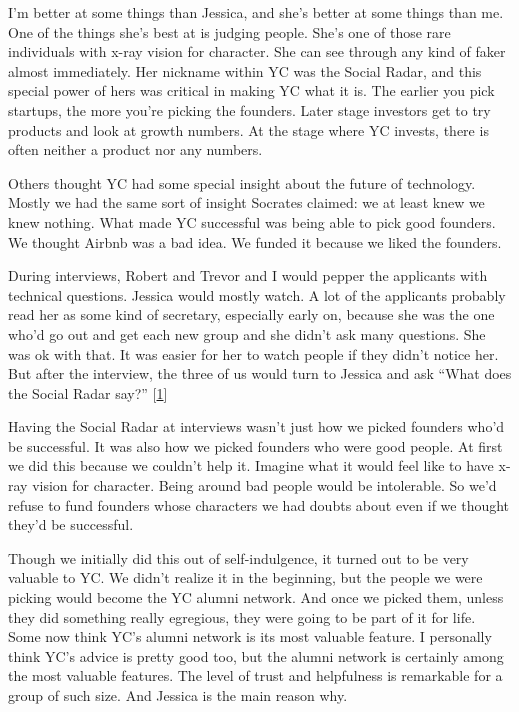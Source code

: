I'm better at some things than Jessica, and she's better at some things
than me. One of the things she's best at is judging people. She's one of
those rare individuals with x-ray vision for character. She can see
through any kind of faker almost immediately. Her nickname within YC was
the Social Radar, and this special power of hers was critical in making
YC what it is. The earlier you pick startups, the more you're picking
the founders. Later stage investors get to try products and look at
growth numbers. At the stage where YC invests, there is often neither a
product nor any numbers.

Others thought YC had some special insight about the future of
technology. Mostly we had the same sort of insight Socrates claimed: we
at least knew we knew nothing. What made YC successful was being able to
pick good founders. We thought Airbnb was a bad idea. We funded it
because we liked the founders.

During interviews, Robert and Trevor and I would pepper the applicants
with technical questions. Jessica would mostly watch. A lot of the
applicants probably read her as some kind of secretary, especially early
on, because she was the one who'd go out and get each new group and she
didn't ask many questions. She was ok with that. It was easier for her
to watch people if they didn't notice her. But after the interview, the
three of us would turn to Jessica and ask ``What does the Social Radar
say?'' {[}\hyperref[f1n]{1}{]}

Having the Social Radar at interviews wasn't just how we picked founders
who'd be successful. It was also how we picked founders who were good
people. At first we did this because we couldn't help it. Imagine what
it would feel like to have x-ray vision for character. Being around bad
people would be intolerable. So we'd refuse to fund founders whose
characters we had doubts about even if we thought they'd be successful.

Though we initially did this out of self-indulgence, it turned out to be
very valuable to YC. We didn't realize it in the beginning, but the
people we were picking would become the YC alumni network. And once we
picked them, unless they did something really egregious, they were going
to be part of it for life. Some now think YC's alumni network is its
most valuable feature. I personally think YC's advice is pretty good
too, but the alumni network is certainly among the most valuable
features. The level of trust and helpfulness is remarkable for a group
of such size. And Jessica is the main reason why.

